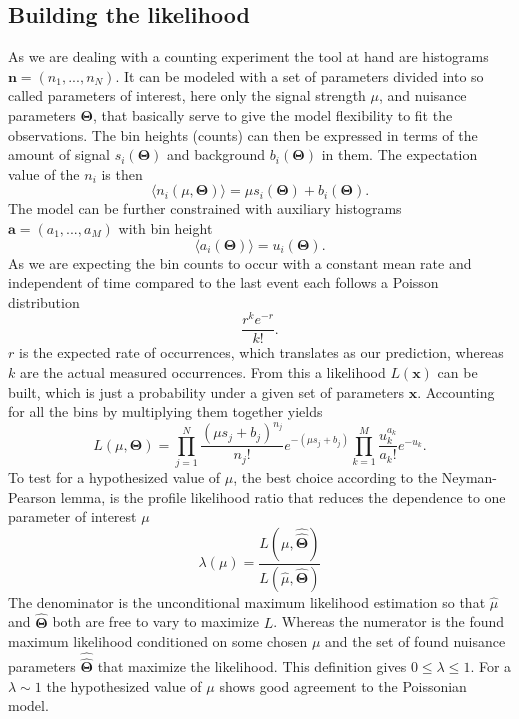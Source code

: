 \subsection{Building the likelihood}
As we are dealing with a counting experiment the tool at hand are histograms $\bm{n}=(n_1,...,n_N)$. It can be modeled with a set of parameters divided into so called parameters of interest, here only the signal strength $\mu$, and nuisance parameters $\bm{\Theta}$, that basically serve to give the model flexibility to fit the observations. The bin heights (counts) can then be expressed in terms of the amount of signal $s_i(\bm{\Theta})$ and background $b_i(\bm{\Theta})$ in them. The expectation value of the $n_i$ is then
\begin{equation} \label{eq:n_i}
    \langle n_i(\mu,\bm{\Theta})\rangle = \mu s_i(\bm{\Theta}) +b_i(\bm{\Theta}).
\end{equation}
The model can be further constrained with auxiliary histograms $\bm{a}=(a_1,...,a_M)$ with bin height
\begin{equation} \label{eq:a_i}
    \langle a_i(\bm{\Theta}) \rangle = u_i(\bm{\Theta}).
\end{equation}
As we are expecting the bin counts to occur with a constant mean rate and independent of time compared to the last event each follows a Poisson distribution
\begin{equation}\label{eq:poisson}
    \frac{r^k e^{-r}}{k!}.
\end{equation}
$r$ is the expected rate of occurrences, which translates as our prediction, whereas $k$ are the actual measured occurrences. From this a likelihood $L(\bm{x})$ can be built, which is just a probability under a given set of parameters $\bm{x}$. Accounting for all the bins by multiplying them together yields
\begin{equation}
    L(\mu,\bm{\Theta})=
    \prod_{j=1}^N \frac{(\mu s_j + b_j)^{n_j}}{n_j !} e^{-(\mu s_j + b_j)}
    \prod_{k=1}^M \frac{u_k^{a_k}}{a_k!} e^{-u_k}.
\end{equation}
To test for a hypothesized value of $\mu$, the best choice according to the Neyman-Pearson lemma, is the profile likelihood ratio that reduces the dependence to one parameter of interest $\mu$
\begin{equation}
\lambda(\mu)=
    \frac{L(\mu,\hat{\hat{\bm{\Theta}}})}
    {L(\hat{\mu},\hat{\bm{\Theta}})}
\end{equation}
The denominator is the unconditional maximum likelihood estimation so that $\hat{\mu}$ and $\hat{\bm{\Theta}}$ both are free to vary to maximize $L$. Whereas the numerator is the found maximum likelihood conditioned on some chosen $\mu$ and the set of found nuisance parameters $\hat{\hat{\bm{\Theta}}}$ that maximize the likelihood. This definition gives $0 \leq \lambda \leq 1$. For a $\lambda \sim 1$ the hypothesized value of $\mu$ shows good agreement to the Poissonian model.

